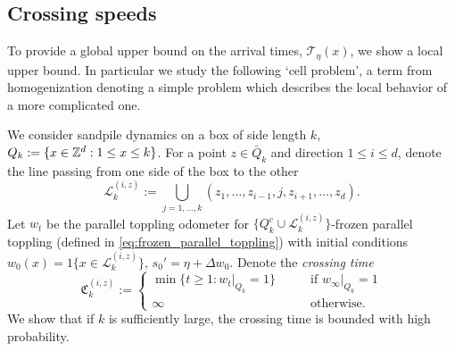 \documentclass[12pt]{amsart}
\begin{document}
\subsection{Crossing speeds}
To provide a global upper bound on the arrival times, $\mathcal{T}_{\eta}(x)$, we show a local upper bound. In particular 
we study the following `cell problem', a term from homogenization denoting 
a simple problem which describes the local behavior of a more complicated one. 

We consider sandpile dynamics on a box of side length $k$, $Q_k := \{x \in \mathbb{Z}^d : 1 \leq x \leq k\}$. For a point $z \in \bar{Q}_k$ and direction $1 \leq i \leq d$, denote the line passing from one side of the
box to the other 
\begin{equation}
\mathcal{L}_k^{(i,z)} := \bigcup_{j=1,\ldots,k} (z_1, \ldots, z_{i-1}, j, z_{i+1}, \ldots, z_d).
\end{equation}
Let $w_t$ be the parallel toppling odometer for $\{Q_k^c \cup \mathcal{L}_k^{(i,z)}\}$-frozen parallel toppling (defined in \eqref{eq:frozen_parallel_toppling})
with initial conditions $w_0(x) = 1\{x \in \mathcal{L}_k^{(i,z)}\}$, $s_0' = \eta + \Delta w_0$. Denote the {\it crossing time}
\begin{equation}
\mathfrak{C}_{k}^{(i,z)} := 
\begin{cases}
\min \{ t \geq 1 : w_t|_{Q_k} = 1 \} \qquad &\mbox{if $w_{\infty} |_{Q_k} = 1$}  \\
\infty \qquad &\mbox{otherwise}.
\end{cases}
\end{equation}
We show that if $k$ is sufficiently large, the crossing time is bounded with high probability.
\end{document}
